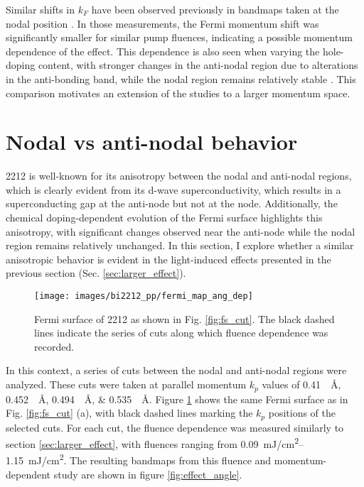 Similar shifts in $k_F$ have been observed previously in bandmaps taken at the nodal position \cite{rameau_photoinduced_2014}.
In those measurements, the Fermi momentum shift was significantly smaller for similar pump fluences, indicating a possible momentum dependence of the effect.
This dependence is also seen when varying the hole-doping content, with stronger changes in the anti-nodal region due to alterations in the anti-bonding band, while the nodal region remains relatively stable \cite{drozdov_phase_2018}.
This comparison motivates an extension of the studies to a larger momentum space.

\section{Nodal vs anti-nodal behavior}
\label{sec:angle}

2212 is well-known for its anisotropy between the nodal and anti-nodal regions, which is clearly evident from its d-wave superconductivity, which results in a superconducting gap at the anti-node but not at the node.
Additionally, the chemical doping-dependent evolution of the Fermi surface highlights this anisotropy, with significant changes observed near the anti-node while the nodal region remains relatively unchanged.
In this section, I explore whether a similar anisotropic behavior is evident in the light-induced effects presented in the previous section (Sec. \ref{sec:larger_effect}).

\begin{figure}[bh]
	\centering
	\texttt{[image: images/bi2212\_pp/fermi\_map\_ang\_dep]}
	\caption{Fermi surface of 2212 as shown in Fig. \ref{fig:fs_cut}. The black dashed lines indicate the series of cuts along which fluence dependence was recorded.}
	\label{fig:fermimap_angdep}
\end{figure}

In this context, a series of cuts between the nodal and anti-nodal regions were analyzed.
These cuts were taken at parallel momentum $k_p$ values of \qtylist{0.41;0.452;0.494;0.535}{\per\angstrom}.
Figure  \ref{fig:fermimap_angdep} shows the same Fermi surface as in Fig. \ref{fig:fs_cut} (a), with black dashed lines marking the $k_p$ positions of the selected cuts.
For each cut, the fluence dependence was measured similarly to section \ref{sec:larger_effect}, with fluences ranging from \qtyrange{0.09}{1.15}{\milli\joule/\centi\meter\squared}.
The resulting bandmaps from this fluence and momentum-dependent study are shown in figure \ref{fig:effect_angle}.

